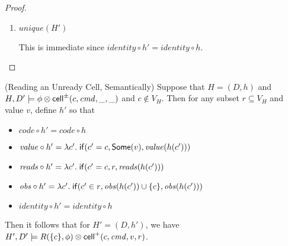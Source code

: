 \begin{proof}
\begin{enumerate}
\item $\mathit{unique}(H')$

This is immediate since $\mathit{identity} \circ h' = \mathit{identity} \circ h$.
\end{enumerate}
\end{proof}

\begin{lemma}{(Reading an Unready Cell, Semantically)}
Suppose that $H = (D,h)$ and $H, D' \models \phi \otimes
\mathsf{cell}^{\pm}({c}, {\mathit{cmd}}, {\_}, {\_})$ and $c \not\in V_H$. Then for any subset $r
\subseteq V_H$ and value $v$, define $h'$ so that
\begin{itemize}
\item $\mathit{code} \circ h' = \mathit{code} \circ h$ 
\item $\mathit{value} \circ h' = \lambda c'.\;\mathsf{if}({c' = c}, {\mathsf{Some}(v)}, {\mathit{value}(h(c'))})$ 
\item $\mathit{reads} \circ h' = \lambda c'.\;\mathsf{if}({c' = c}, {r}, {\mathit{reads}(h(c'))})$ 
\item $\mathit{obs} \circ h' = \lambda c'.\;\mathsf{if}({c' \in r}, {\mathit{obs}(h(c')) \cup \{{c}\}}, {\mathit{obs}(h(c'))})$ 
\item $\mathit{identity} \circ h' = \mathit{identity} \circ h$
\end{itemize}
Then it follows that for $H' = (D,h')$, we have $H', D' \models R(\{{c}\}, \phi) \otimes \mathsf{cell}^{+}({c}, {\mathit{cmd}}, {v}, {r})$.
\end{lemma}

